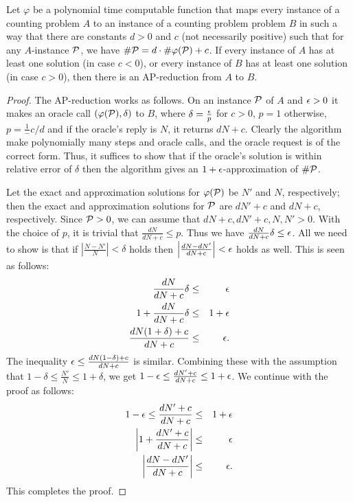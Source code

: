 \begin{lemma} \label{lem:linear}
Let \(\varphi\) be a polynomial time computable function that maps every instance of a
counting problem \(A\) to an instance of a counting problem problem \(B\) in such a way that
there are constants \(d > 0\) and \(c\) (not necessarily positive) such that
for any \(A\)-instance \(\mathcal{P}\), we have
\(\#\mathcal{P} = d\cdot \#\varphi(\mathcal{P}) + c\)\@. If every instance of \(A\)
has at least one solution 
(in case \(c < 0\)), or every instance of \(B\) has at least one solution (in case \(c>0\)), then
there is an AP-reduction from \(A\) to \(B\)\@.
\end{lemma}

\begin{proof}
The AP-reduction works as follows. On an instance \(\mathcal{P}\) of \(A\) and \(\epsilon > 0\) it makes 
an oracle call \((\varphi(\mathcal{P}),\delta)\) to \(B\), where \(\delta = \frac{\epsilon}{p}\) for 
\(c > 0\), \(p = 1\) otherwise, \(p = \frac1-c/d\) and
if the oracle's reply is \(N\), it returns \(dN + c\)\@. Clearly the algorithm make polynomially 
many steps and oracle calls, and the oracle request is of the correct form.
Thus, it suffices to show that if the oracle's solution is within relative error of \(\delta\) then
the algorithm gives an \(1+\epsilon\)-approximation of \(\#\mathcal{P}\)\@.

Let the exact and approximation solutions for \(\varphi(\mathcal{P})\) be \(N'\) and \(N\), respectively;
then the exact and approximation solutions for \(\mathcal{P}\) are  
\(dN' + c\) and \(dN + c\), respectively. Since \(\mathcal{P} > 0\), we can 
assume that \(dN+c,dN'+c,N,N'>0\)\@. With the choice of \(p\), it is trivial that
 \(\frac{dN}{dN+c} \le p\)\@. Thus we have \(\frac{dN}{dN+c}\delta \le \epsilon\).
All we need to show is that if \(\left|\frac{N-N'}{N}\right|<\delta\) holds then
\(\left|\frac{dN-dN'}{dN+c}\right|<\epsilon\) holds as well. This is seen as follows:
\begin{eqnarray*}
\frac{dN}{dN+c}\delta & \le & \epsilon \\
1 + \frac{dN}{dN+c}\delta & \le & 1 + \epsilon \\
\frac{d N (1+\delta)+c}{d N + c} & \le & \epsilon.\\
\end{eqnarray*}
The inequality \(\epsilon \le \frac{d N (1-\delta)+c}{d N + c}\) is similar.
Combining these with the assumption that \(1-\delta \le \frac{N'}{N} \le 1 + \delta \),
we get \(1-\epsilon \le \frac{dN'+c}{dN+c} \le 1 + \epsilon\). We continue with the proof as follows:
\begin{eqnarray*}
1-\epsilon \le \frac{dN'+c}{dN+c} & \le & 1 + \epsilon \\
\left|1 + \frac{dN' + c}{dN + c}\right| &\le & \epsilon \\
\left| \frac{dN-dN'}{dN+c}\right| & \le& \epsilon.
\end{eqnarray*}
This completes the proof.
\end{proof}

